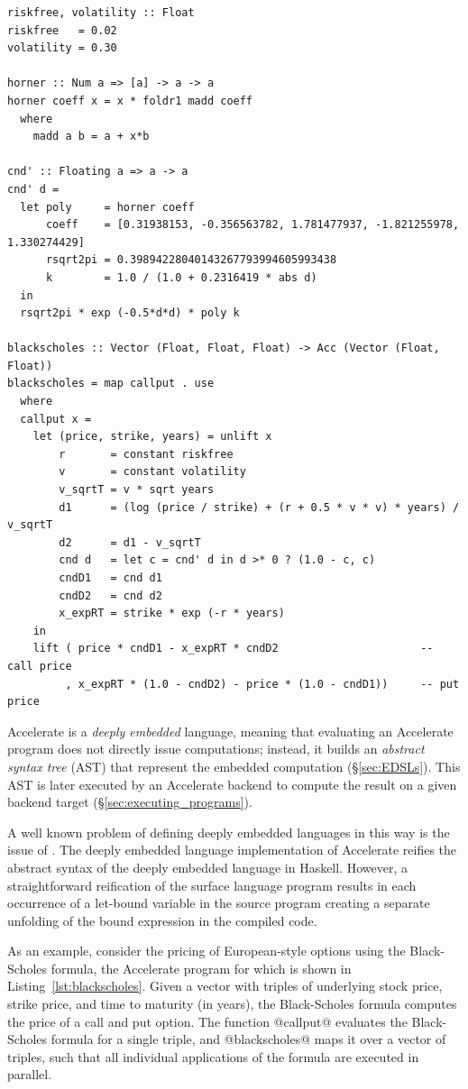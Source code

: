 \begin{lstlisting}[style=haskell_float
    ,float=t
    ,label=lst:blackscholes
    ,caption={Black-Scholes option pricing}]
riskfree, volatility :: Float
riskfree   = 0.02
volatility = 0.30

horner :: Num a => [a] -> a -> a
horner coeff x = x * foldr1 madd coeff
  where
    madd a b = a + x*b

cnd' :: Floating a => a -> a
cnd' d =
  let poly     = horner coeff
      coeff    = [0.31938153, -0.356563782, 1.781477937, -1.821255978, 1.330274429]
      rsqrt2pi = 0.39894228040143267793994605993438
      k        = 1.0 / (1.0 + 0.2316419 * abs d)
  in
  rsqrt2pi * exp (-0.5*d*d) * poly k

blackscholes :: Vector (Float, Float, Float) -> Acc (Vector (Float, Float))
blackscholes = map callput . use
  where
  callput x =
    let (price, strike, years) = unlift x
        r       = constant riskfree
        v       = constant volatility
        v_sqrtT = v * sqrt years
        d1      = (log (price / strike) + (r + 0.5 * v * v) * years) / v_sqrtT
        d2      = d1 - v_sqrtT
        cnd d   = let c = cnd' d in d >* 0 ? (1.0 - c, c)
        cndD1   = cnd d1
        cndD2   = cnd d2
        x_expRT = strike * exp (-r * years)
    in
    lift ( price * cndD1 - x_expRT * cndD2                      -- call price
         , x_expRT * (1.0 - cndD2) - price * (1.0 - cndD1))     -- put price
\end{lstlisting}

Accelerate is a \emph{deeply embedded} language, meaning that evaluating an
Accelerate program does not directly issue computations; instead, it builds an
\emph{abstract syntax tree} (AST\AST{}) that represent the embedded computation
(\S\ref{sec:EDSLs}). This AST is later executed by an Accelerate backend to
compute the result on a given backend target (\S\ref{sec:executing_programs}).

A well known problem of defining deeply embedded languages in this way is the
issue of . The deeply embedded language implementation of
Accelerate reifies the abstract syntax of the deeply embedded language in
Haskell. However, a straightforward reification of the surface language program
results in each occurrence of a let-bound variable in the source program
creating a separate unfolding of the bound expression in the compiled code.

As an example, consider the pricing of European-style options using the
Black-Scholes formula, the Accelerate program for which is shown in
Listing~\ref{lst:blackscholes}. Given a vector with triples of underlying stock
price, strike price, and time to maturity (in years), the Black-Scholes formula
computes the price of a call and put option. The function @callput@ evaluates
the Black-Scholes formula for a single triple, and @blackscholes@ maps it over a
vector of triples, such that all individual applications of the formula are
executed in parallel.

